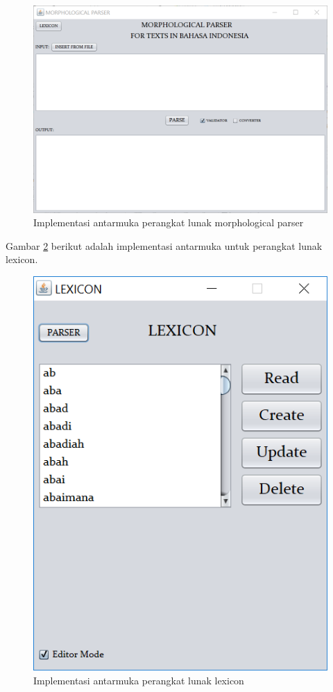 \begin{figure}[H]
\centering
\includegraphics[scale=0.7]{Gambar/gambar-implementasi-antarmuka-parser}
\caption{Implementasi antarmuka perangkat lunak morphological parser} 
\label{gambar-implementasi-antarmuka-parser}
\end{figure}

Gambar \ref{gambar-implementasi-antarmuka-lexicon} berikut adalah implementasi antarmuka untuk perangkat lunak lexicon.

\begin{figure}[H]
\centering
\includegraphics[scale=0.7]{Gambar/gambar-implementasi-antarmuka-lexicon}
\caption{Implementasi antarmuka perangkat lunak lexicon} 
\label{gambar-implementasi-antarmuka-lexicon}
\end{figure}

